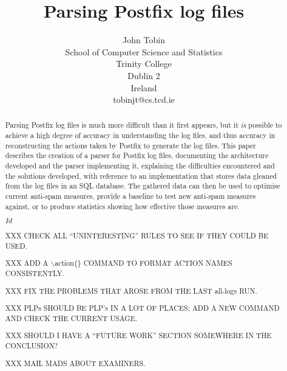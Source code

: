 \documentclass[a4paper,12pt,draft]{report}
\begin{document}
\title{Parsing Postfix log files}
\author{John Tobin \\ School of Computer Science and Statistics \\
Trinity College \\ Dublin 2 \\ Ireland \\ tobinjt@cs.tcd.ie}
\maketitle

\begin{abstract}

    \setcounter{page}{2}

    Parsing Postfix log files is much more difficult than it first appears,
    but it \textit{is\/} possible to achieve a high degree of accuracy in
    understanding the log files, and thus accuracy in reconstructing the
    actions taken by Postfix to generate the log files.  This paper
    describes the creation of a parser for Postfix log files, documenting
    the architecture developed and the parser implementing it, explaining
    the difficulties encountered and the solutions developed, with
    reference to an implementation that stores data gleaned from the log
    files in an SQL database.  The gathered data can then be used to
    optimise current anti-spam measures, provide a baseline to test new
    anti-spam measures against, or to produce statistics showing how
    effective those measures are.

    \SVN$Id$
    \begin{center}
        \SVNId{}
    \end{center}

    XXX CHECK ALL ``UNINTERESTING'' RULES TO SEE IF THEY COULD BE USED\@.

    XXX ADD A $\backslash{}$action\{\} COMMAND TO FORMAT ACTION NAMES
    CONSISTENTLY\@.

    XXX FIX THE PROBLEMS THAT AROSE FROM THE LAST all-logs RUN\@.

    XXX PLPs SHOULD BE PLP's IN A LOT OF PLACES\@; ADD A NEW COMMAND AND
    CHECK THE CURRENT USAGE\@.

    XXX SHOULD I HAVE A ``FUTURE WORK'' SECTION SOMEWHERE IN THE
    CONCLUSION\@?

    XXX MAIL MADS ABOUT EXAMINERS\@.

\end{abstract}
\end{document}
